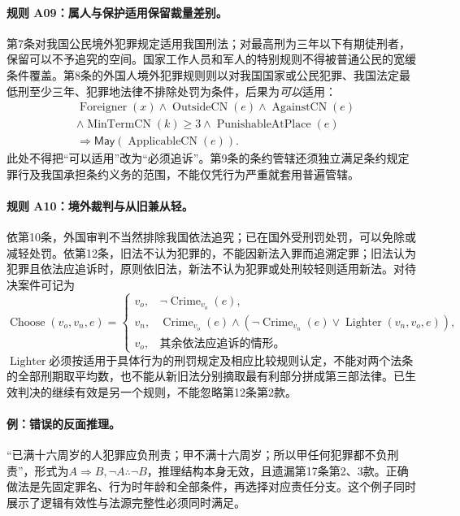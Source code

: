 \paragraph{规则 A09：属人与保护适用保留裁量差别。}
第7条对我国公民境外犯罪规定适用我国刑法；对最高刑为三年以下有期徒刑者，保留可以不予追究的空间。国家工作人员和军人的特别规则不得被普通公民的宽缓条件覆盖。第8条的外国人境外犯罪规则则以对我国国家或公民犯罪、我国法定最低刑至少三年、犯罪地法律不排除处罚为条件，后果为\emph{可以}适用：
\[
\begin{aligned}
&\operatorname{Foreigner}(x)\land\operatorname{OutsideCN}(e)
\land\operatorname{AgainstCN}(e)\\
&\land\operatorname{MinTermCN}(k)\ge3
\land\operatorname{PunishableAtPlace}(e)\\
&\Longrightarrow\mathsf{May}(\operatorname{ApplicableCN}(e)).
\end{aligned}
\]
此处不得把“可以适用”改为“必须追诉”。第9条的条约管辖还须独立满足条约规定罪行及我国承担条约义务的范围，不能仅凭行为严重就套用普遍管辖。

\paragraph{规则 A10：境外裁判与从旧兼从轻。}
依第10条，外国审判不当然排除我国依法追究；已在国外受刑罚处罚，可以免除或减轻处罚。依第12条，旧法不认为犯罪的，不能因新法入罪而追溯定罪；旧法认为犯罪且依法应追诉时，原则依旧法，新法不认为犯罪或处刑较轻则适用新法。对待决案件可记为
\[
\operatorname{Choose}(v_o,v_n,e)=
\begin{cases}
v_o,&\neg\operatorname{Crime}_{v_o}(e),\\
v_n,&\operatorname{Crime}_{v_o}(e)\land
(\neg\operatorname{Crime}_{v_n}(e)\lor\operatorname{Lighter}(v_n,v_o,e)),\\
v_o,&\text{其余依法应追诉的情形。}
\end{cases}
\]
$\operatorname{Lighter}$必须按适用于具体行为的刑罚规定及相应比较规则认定，不能对两个法条的全部刑期取平均数，也不能从新旧法分别摘取最有利部分拼成第三部法律。已生效判决的继续有效是另一个规则，不能忽略第12条第2款。

\paragraph{例：错误的反面推理。}
“已满十六周岁的人犯罪应负刑责；甲不满十六周岁；所以甲任何犯罪都不负刑责”，形式为$A\Rightarrow B,\neg A\therefore\neg B$，推理结构本身无效，且遗漏第17条第2、3款。正确做法是先固定罪名、行为时年龄和全部条件，再选择对应责任分支。这个例子同时展示了逻辑有效性与法源完整性必须同时满足。

